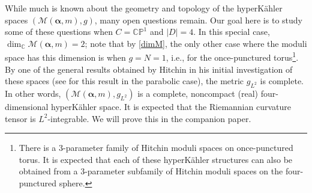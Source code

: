 \documentclass[12pt,letterpaper,reqno]{amsart}
\def\mathbf#1{#1}%
\theoremstyle{remark}
\theoremstyle{definition}
\numberwithin{thm}{section}
\numberwithin{equation}{section}
\numberwithin{figure}{section}
\newcommand{\C}{\ensuremath{\mathbb C}}
\newcommand{\CP}{\ensuremath{\mathbb {CP}}}
\newcommand{\cMam}{\mathcal{M}(\boldsymbol{\alpha}, \mathbf{m})}
\begin{document}
\bigskip

While much is known about the geometry and topology of the hyperK\"ahler spaces $(\cMam, g)$, many open questions remain.   Our goal here is to 
study some of these questions when $C= \CP^1$ 
and $|D| = 4$. In this special case, $\dim_{\C} \cMam = 2$; note that by \eqref{dimM}, the only other case where the moduli space has this dimension 
is when $g=N=1$, i.e., for the once-punctured torus\footnote{There is a $3$-parameter family of Hitchin moduli spaces on once-punctured torus. It is expected that each of these hyperK\"ahler structures can also be obtained from a $3$-parameter subfamily of Hitchin moduli spaces on the four-punctured sphere.}.  By one of the general results obtained by Hitchin in his initial investigation of these spaces \cite{hitchin87} (see \cite{simpsonnoncompact} 
for this result in the parabolic case), the metric $g_{L^2}$ is complete.  In other words, $(\cMam, g_{L^2})$ is a complete, noncompact (real) 
four-dimensional hyperK\"ahler space. It is expected that the Riemannian curvature tensor is $L^2$-integrable. We will prove this in the companion paper.  


\bigskip
\end{document}
